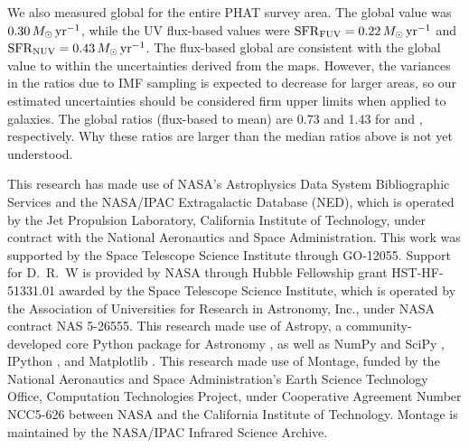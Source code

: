\documentclass[iop, tighten]{emulateapj}
\begin{document}
We also measured global  for the entire PHAT survey area. The global
\sfroneh{} value was $0.30\,M_\odot\,\mathrm{yr}^{-1}$, while the UV flux-based values were
$\mathrm{SFR}_{\mathrm{FUV}} = 0.22\,M_\odot\,\mathrm{yr}^{-1}$ and $\mathrm{SFR}_{\mathrm{NUV}} = 0.43\,M_\odot\,\mathrm{yr}^{-1}$. The flux-based
global  are consistent with the global \sfroneh{} value to within the
uncertainties derived from the \sfr{} maps. However, the variances in the
\sfr{} ratios due to IMF sampling is expected to decrease for larger areas, so
our estimated uncertainties should be considered firm upper limits when applied
to galaxies. The global \sfr{} ratios (flux-based to mean) are 0.73 and 1.43
for \fuv{} and \nuv{}, respectively. Why these ratios are larger than the
median ratios above is not yet understood.

This research has made use of NASA's Astrophysics Data System Bibliographic
Services and the NASA/IPAC Extragalactic Database (NED), which is operated by
the Jet Propulsion Laboratory, California Institute of Technology, under
contract with the National Aeronautics and Space Administration. This work was
supported by the Space Telescope Science Institute through GO-12055. Support
for D.~R.~W is provided by NASA through Hubble Fellowship grant HST-HF-51331.01
awarded by the Space Telescope Science Institute, which is operated by the
Association of Universities for Research in Astronomy, Inc., under NASA
contract NAS 5-26555. This research made use of Astropy, a community-developed
core Python package for Astronomy \citep{Astropy_Collaboration:2013}, as well
as NumPy and SciPy \citep{Oliphant:2007}, IPython \citep{Perez:2007}, and
Matplotlib \citep{Hunter:2007}. This research made use of Montage, funded by
the National Aeronautics and Space Administration's Earth Science Technology
Office, Computation Technologies Project, under Cooperative Agreement Number
NCC5-626 between NASA and the California Institute of Technology. Montage is
maintained by the NASA/IPAC Infrared Science Archive.






\end{document}

